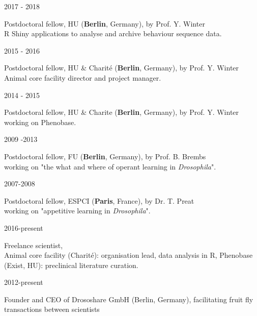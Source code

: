 %
\parbox{0.15\textwidth}{2017 - 2018}\hfill
\parbox[t]{0.83\textwidth}{Postdoctoral fellow,
       HU  (\textbf{Berlin}, Germany),
        by Prof. Y. Winter\\
        R Shiny applications to analyse and archive behaviour sequence data.}
%
\parbox{0.15\textwidth}{2015 - 2016}\hfill
\parbox[t]{0.83\textwidth}{Postdoctoral fellow,
       HU \& Charit\'e (\textbf{Berlin}, Germany),
        by Prof. Y. Winter\\
        Animal core facility director and project manager.}
\parbox{0.15\textwidth}{2014 - 2015}\hfill
\parbox[t]{0.83\textwidth}{Postdoctoral fellow,
       HU \& Charite (\textbf{Berlin}, Germany),
        by Prof. Y. Winter\\
        working on Phenobase.}
%
%
\parbox{0.15\textwidth}{2009 -2013}\hfill
\parbox[t]{0.83\textwidth}{Postdoctoral fellow,
       FU (\textbf{Berlin}, Germany),
        by Prof. B. Brembs\\
        working on "the what and where of operant learning in \textit{Drosophila}".}
                \parbox{0.15\textwidth}{2007-2008}\hfill
\parbox[t]{0.83\textwidth}{Postdoctoral fellow,
       ESPCI (\textbf{Paris}, France), by Dr. T. Preat\\
        working on "appetitive learning in \textit{Drosophila}".
        }


%
\parbox{0.15\textwidth}{2016-present}\hfill
\parbox[t]{0.83\textwidth}{Freelance scientist,\\
        Animal core facility (Charit\'e): organisation lead, data analysis in R,
        Phenobase (Exist, HU): preclinical 
        literature curation.}
%        
\parbox{0.15\textwidth}{2012-present}\hfill
\parbox[t]{0.83\textwidth}{Founder and CEO 
       of Drososhare GmbH (Berlin, Germany),
        facilitating fruit fly transactions between scientists}

  
%
                
